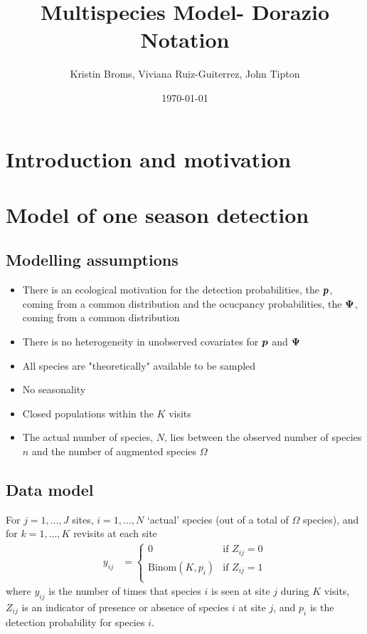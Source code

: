 \documentclass[fleqn]{article}
\title{Multispecies Model- Dorazio Notation}
\author{Kristin Broms, Viviana Ruiz-Guiterrez, John Tipton}
\date{\today}
\def\bm#1{\mbox{\boldmath $#1$}}
\begin{document}
%
\maketitle
%
\section{Introduction and motivation}
%
\section{Model of one season detection}
%
\subsection{Modelling assumptions}
%
\begin{itemize}
  \item There is an ecological motivation for the detection probabilities, the $\bm{p}$, coming from a common distribution and the ocucpancy probabilities, the $\bm{\Psi}$, coming from a common distribution
  \item There is no heterogeneity in unobserved covariates for $\bm{p}$ and $\bm{\Psi}$
  \item All species are "theoretically" available to be sampled
  \item No seasonality
  \item Closed populations within the $K$ visits
  \item The actual number of species, $N$, lies between the observed number of species $n$ and the number of augmented species $\Omega$
\end{itemize}
%
\subsection{Data model}
%
For $j = 1, \ldots, J$ sites,  $i = 1, \ldots, N$ `actual' species (out of a total of $\Omega$ species), and for $k = 1, \ldots, K$ revisits at each site
%
\begin{align*}
  y_{ij} & = 
    \begin{cases}
      0 & \mbox{if } Z_{ij} = 0\\
      \mbox{Binom}(K, p_i) & \mbox{if } Z_{ij} = 1\\
    \end{cases}
\end{align*}
%
where $y_{ij}$ is the number of times that species $i$ is seen at site $j$ during $K$ visits, $Z_{ij}$ is an indicator of presence or absence of species $i$ at site $j$, and $p_i$ is the detection probability for species $i$.
%
\end{document}

